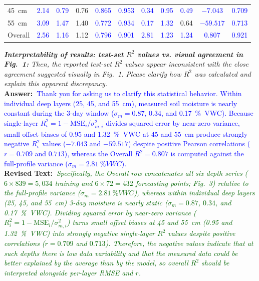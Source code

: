 \documentclass[10pt]{article}
\newcommand{\query}[2][]{\ifthenelse{\equal{#1}{}}{}{\textbf{#1:}~}\emph{#2}}
\newcommand{\ans}[1]{\textbf{Answer:~}#1}
\newcommand{\Rtext}[1]{\textbf{Revised Text:~}#1}
\begin{document}
\begin{center}
\begin{minipage}{0.96\linewidth}
\begin{tabular}{@{}lcccccccccc@{}}
45~\si{cm} & \textcolor{blue}{2.14} & \textcolor{blue}{0.79} & 0.76 & \textcolor{blue}{0.865} & \textcolor{blue}{0.953} & \textcolor{blue}{0.34} & \textcolor{blue}{0.95} & \textcolor{blue}{0.49} & \textcolor{blue}{$-7.043$} & \textcolor{blue}{0.709} \\
55~\si{cm} & \textcolor{blue}{3.09} & \textcolor{blue}{1.47} & 1.40 & \textcolor{blue}{0.772} & \textcolor{blue}{0.934} & \textcolor{blue}{0.17} & \textcolor{blue}{1.32} & 0.64 & \textcolor{blue}{$-59.517$} & \textcolor{blue}{0.713} \\
\midrule
Overall & \textcolor{blue}{2.56} & \textcolor{blue}{1.16} & 1.12 & \textcolor{blue}{0.796} & \textcolor{blue}{0.901} & \textcolor{blue}{2.81} & \textcolor{blue}{1.23} & \textcolor{blue}{1.24} & \textcolor{blue}{0.807} & \textcolor{blue}{0.921} \\
\bottomrule
\end{tabular}
\end{minipage}
\end{center}

\query[R-1.3b]{\textbf{Interpretability of results: test-set $R^2$ values vs. visual agreement in Fig.~1:} Then, the reported test-set $R^2$ values appear inconsistent with the close agreement suggested visually in Fig.~1. Please clarify how $R^2$ was calculated and explain this apparent discrepancy.}\\
\ans{\textcolor{blue}{Thank you for asking us to clarify this statistical behavior. Within individual deep layers (25, 45, and 55~\si{cm}), measured soil moisture is nearly constant during the 3-day window ($\sigma_m = 0.87$, $0.34$, and \SI{0.17}{\%VWC}). Because single-layer $R^2_i = 1 - \mathrm{MSE}_i/\sigma_{m,i}^2$ divides squared error by near-zero variance, small offset biases of \SI{0.95}{} and \SI{1.32}{\%VWC} at 45 and 55~\si{cm} produce strongly negative $R^2_i$ values ($-7.043$ and $-59.517$) despite positive Pearson correlations ($r = 0.709$ and $0.713$), whereas the Overall $R^2 = 0.807$ is computed against the full-profile variance ($\sigma_m = \SI{2.81}{\%VWC}$).}}\\
\Rtext{\emph{\textcolor{darkgreen}{Specifically, the Overall row concatenates all six depth series ($6 \times 839 = 5{,}034$ training and $6 \times 72 = 432$ forecasting points; Fig.~3) relative to the full-profile variance ($\sigma_m = \SI{2.81}{\%VWC}$), whereas within individual deep layers (25, 45, and 55~\si{cm}) 3-day moisture is nearly static ($\sigma_m = 0.87$, $0.34$, and \SI{0.17}{\%VWC}). Dividing squared error by near-zero variance ($R^2_i = 1 - \mathrm{MSE}_i/\sigma_{m,i}^2$) turns small offset biases at 45 and 55~\si{cm} (\SI{0.95}{} and \SI{1.32}{\%VWC}) into strongly negative single-layer $R^2$ values despite positive correlations ($r = 0.709$ and $0.713$). Therefore, the negative values indicate that at such depths there is low data variability and that the measured data could be better explained by the average than by the model, so overall $R^2$ should be interpreted alongside per-layer RMSE and $r$.}}}
\end{document}

